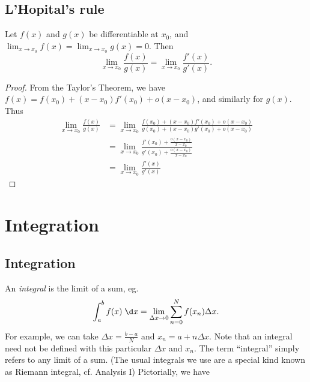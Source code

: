 \documentclass[a4paper]{article}
\begin{document}
  \subsection{L'Hopital's rule}
  \begin{thm}
    Let $f(x)$ and $g(x)$ be differentiable at $x_0$, and $\displaystyle \lim_{x\to x_0}f(x) = \lim_{x\to x_0}g(x) = 0$. Then
    \[
      \lim_{x\to x_0} \frac{f(x)}{g(x)} = \lim_{x\to x_0} \frac{f'(x)}{g'(x)}.
    \]
  \end{thm}
  \begin{proof}
    From the Taylor's Theorem, we have $f(x) = f(x_0) + (x - x_0)f'(x_0) + o(x - x_0)$, and similarly for $g(x)$. Thus
    \begin{align*}
      \lim_{x\to x_0} \frac{f(x)}{g(x)} &= \lim_{x\to x_0} \frac{f(x_0) + (x - x_0)f'(x_0) + o(x - x_0)}{g(x_0) + (x - x_0)g'(x_0) + o(x - x_0)}\\
      &= \lim_{x\to x_0} \frac{f'(x_0) + \frac{o(x-x_0)}{x-x_0}}{g'(x_0) + \frac{o(x-x_0)}{x-x_0}}\\
      &= \lim_{x\to x_0} \frac{f'(x)}{g'(x)}
    \end{align*}
  \end{proof}

  \section{Integration}
  \subsection{Integration}
  \begin{defi}[Integral]
    An \emph{integral} is the limit of a sum, eg. 
    \[
      \int_a^b f(x) \;\d x = \lim_{\Delta x\to 0}\sum_{n=0}^N f(x_n)\Delta x.
    \]
    For example, we can take $\Delta x=\frac{b - a}{N}$ and $x_n = a + n\Delta x$. Note that an integral need not be defined with this particular $\Delta x$ and $x_n$. The term ``integral'' simply refers to any limit of a sum. (The usual integrals we use are a special kind known as Riemann integral, cf. Analysis I) Pictorially, we have
    \begin{center}
    \end{center}
  \end{defi}
\end{document}
